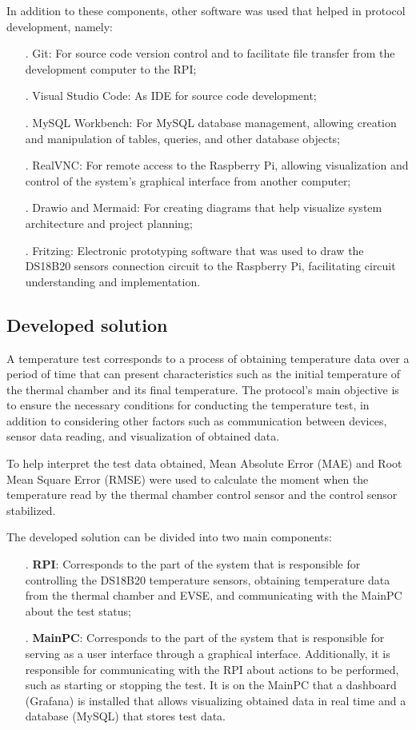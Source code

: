 In addition to these components, other software was used that helped in protocol development, namely:
\begin{itemize}
    \item[.] Git: For source code version control and to facilitate file transfer from the development computer to the RPI;
    \item[.] Visual Studio Code: As IDE for source code development;
    \item[.] MySQL Workbench: For MySQL database management, allowing creation and manipulation of tables, queries, and other database objects;
    \item[.] RealVNC: For remote access to the Raspberry Pi, allowing visualization and control of the system's graphical interface from another computer;
    \item[.] Drawio and Mermaid: For creating diagrams that help visualize system architecture and project planning;
    \item[.] Fritzing: Electronic prototyping software that was used to draw the DS18B20 sensors connection circuit to the Raspberry Pi, facilitating circuit understanding and implementation.
\end{itemize}

\subsection{Developed solution}

A temperature test corresponds to a process of obtaining temperature data over a period of time that can present characteristics such as the initial temperature of the thermal chamber and its final temperature. The protocol's main objective is to ensure the necessary conditions for conducting the temperature test, in addition to considering other factors such as communication between devices, sensor data reading, and visualization of obtained data.

To help interpret the test data obtained, Mean Absolute Error (MAE) and Root Mean Square Error (RMSE) were used to calculate the moment when the temperature read by the thermal chamber control sensor and the control sensor stabilized.

The developed solution can be divided into two main components: 
\begin{itemize}
    \item[.] \textbf{RPI}: Corresponds to the part of the system that is responsible for controlling the DS18B20 temperature sensors, obtaining temperature data from the thermal chamber and EVSE, and communicating with the MainPC about the test status;
    \item[.] \textbf{MainPC}: Corresponds to the part of the system that is responsible for serving as a user interface through a graphical interface. Additionally, it is responsible for communicating with the RPI about actions to be performed, such as starting or stopping the test. It is on the MainPC that a dashboard (Grafana) is installed that allows visualizing obtained data in real time and a database (MySQL) that stores test data.
\end{itemize} 

